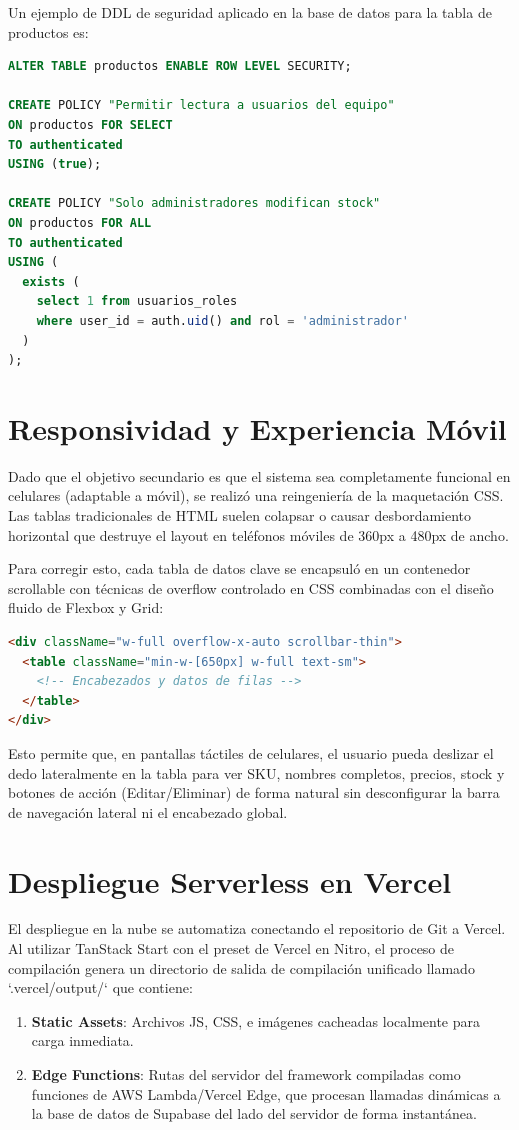 \documentclass[11pt,a4paper]{article}
\begin{document}
Un ejemplo de DDL de seguridad aplicado en la base de datos para la tabla de productos es:
\begin{lstlisting}[language=SQL, caption={Política RLS para modificación de productos}]
ALTER TABLE productos ENABLE ROW LEVEL SECURITY;

CREATE POLICY "Permitir lectura a usuarios del equipo" 
ON productos FOR SELECT 
TO authenticated 
USING (true);

CREATE POLICY "Solo administradores modifican stock" 
ON productos FOR ALL 
TO authenticated 
USING (
  exists (
    select 1 from usuarios_roles 
    where user_id = auth.uid() and rol = 'administrador'
  )
);
\end{lstlisting}

\newpage

\section{Responsividad y Experiencia Móvil}
Dado que el objetivo secundario es que el sistema sea completamente funcional en celulares (adaptable a móvil), se realizó una reingeniería de la maquetación CSS. Las tablas tradicionales de HTML suelen colapsar o causar desbordamiento horizontal que destruye el layout en teléfonos móviles de 360px a 480px de ancho.

Para corregir esto, cada tabla de datos clave se encapsuló en un contenedor scrollable con técnicas de overflow controlado en CSS combinadas con el diseño fluido de Flexbox y Grid:
\begin{lstlisting}[language=HTML, caption={Estructura responsiva para tablas}]
<div className="w-full overflow-x-auto scrollbar-thin">
  <table className="min-w-[650px] w-full text-sm">
    <!-- Encabezados y datos de filas -->
  </table>
</div>
\end{lstlisting}
Esto permite que, en pantallas táctiles de celulares, el usuario pueda deslizar el dedo lateralmente en la tabla para ver SKU, nombres completos, precios, stock y botones de acción (Editar/Eliminar) de forma natural sin desconfigurar la barra de navegación lateral ni el encabezado global.

\section{Despliegue Serverless en Vercel}
El despliegue en la nube se automatiza conectando el repositorio de Git a Vercel. Al utilizar TanStack Start con el preset de Vercel en Nitro, el proceso de compilación genera un directorio de salida de compilación unificado llamado `.vercel/output/` que contiene:
\begin{enumerate}
    \item \textbf{Static Assets}: Archivos JS, CSS, e imágenes cacheadas localmente para carga inmediata.
    \item \textbf{Edge Functions}: Rutas del servidor del framework compiladas como funciones de AWS Lambda/Vercel Edge, que procesan llamadas dinámicas a la base de datos de Supabase del lado del servidor de forma instantánea.
\end{enumerate}
\end{document}
